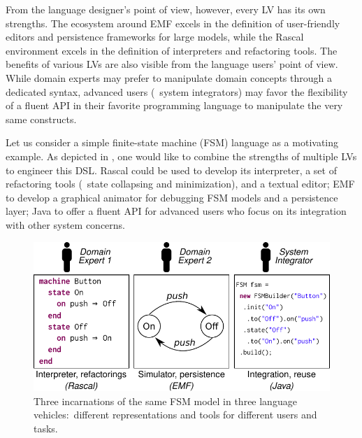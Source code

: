 From the language designer's point of view, however, every LV has its own strengths.
The ecosystem around EMF excels in the definition of user-friendly editors and persistence frameworks for large models, while the Rascal environment excels in the definition of interpreters and refactoring tools.
The benefits of various LVs are also visible from the language users' point of view.
While domain experts may prefer to manipulate domain concepts through a dedicated syntax, advanced users (\eg~system integrators) may favor the flexibility of a fluent API in their favorite programming language to manipulate the very same constructs.

Let us consider a simple finite-state machine (FSM) language as a motivating example.
As depicted in , one would like to combine the strengths of multiple LVs to engineer this DSL.
Rascal could be used to develop its interpreter, a set of refactoring tools (\eg~state collapsing and minimization), and a textual editor; EMF to develop a graphical animator for debugging FSM models and a persistence layer; Java to offer a fluent API for advanced users who focus on its integration with other system concerns.

\begin{figure}[bt]
	\centering
	\includegraphics[width=\columnwidth]{figures/motivating-fsm-simplified-2}
	\caption{Three incarnations of the same FSM model in three language vehicles:~different representations and tools for different users and tasks.}
	\label{fig:motivating-fsm}
\end{figure}

